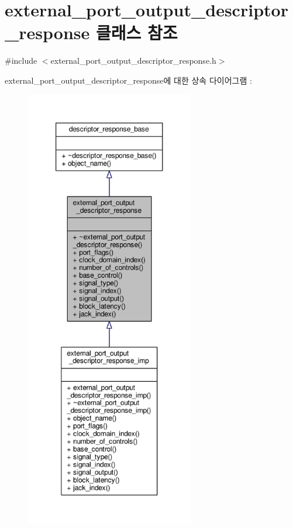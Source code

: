 \hypertarget{classavdecc__lib_1_1external__port__output__descriptor__response}{}\section{external\+\_\+port\+\_\+output\+\_\+descriptor\+\_\+response 클래스 참조}
\label{classavdecc__lib_1_1external__port__output__descriptor__response}


{\ttfamily \#include $<$external\+\_\+port\+\_\+output\+\_\+descriptor\+\_\+response.\+h$>$}



external\+\_\+port\+\_\+output\+\_\+descriptor\+\_\+response에 대한 상속 다이어그램 \+: 
\nopagebreak
\begin{figure}[H]
\begin{center}
\leavevmode
\includegraphics[height=550pt]{classavdecc__lib_1_1external__port__output__descriptor__response__inherit__graph}
\end{center}
\end{figure}


